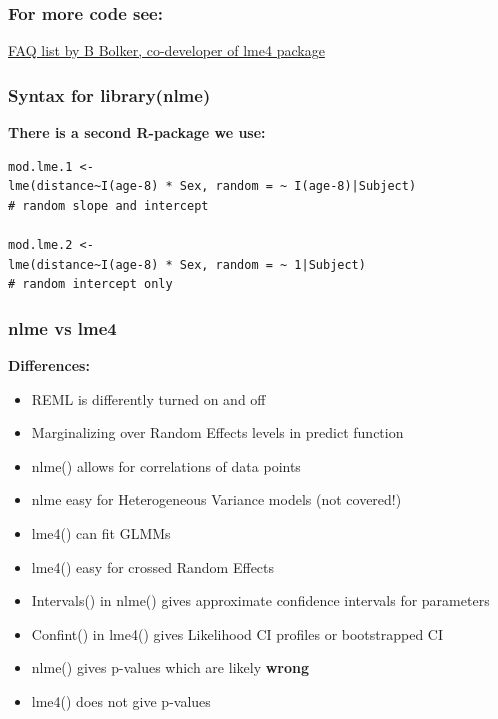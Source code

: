 \documentclass{beamer}
\begin{document}
\begin{frame}[fragile]
    \frametitle{For more code see:}
    \Large
    \color{blue}\href{http://bbolker.github.io/mixedmodels-misc/glmmFAQ.html}{FAQ list by B Bolker, co-developer of lme4 package}
\end{frame}

\begin{frame}[fragile]
    \frametitle{Syntax for library(nlme)}
    \textbf{There is a second R-package we use:}

    \small\begin{Verbatim}[frame=single]
mod.lme.1 <- 
lme(distance~I(age-8) * Sex, random = ~ I(age-8)|Subject)
# random slope and intercept

mod.lme.2 <- 
lme(distance~I(age-8) * Sex, random = ~ 1|Subject)
# random intercept only
    \end{Verbatim}
\end{frame}

\begin{frame}[fragile]
    \frametitle{nlme vs lme4}
    \textbf{Differences:}
    \begin{itemize}
        \item REML is differently turned on and off
        \item Marginalizing over Random Effects levels in predict function
        \item nlme() allows for correlations of data points
        \item nlme easy for Heterogeneous Variance models (not covered!)
        \item lme4() can fit GLMMs
        \item lme4() easy for crossed Random Effects
        \item Intervals() in nlme() gives approximate confidence intervals for parameters
        \item Confint() in lme4() gives Likelihood CI profiles or bootstrapped CI
        \item nlme() gives p-values which are likely \textbf{wrong}
        \item lme4() does not give p-values
    \end{itemize}
\end{frame}
\end{document}
